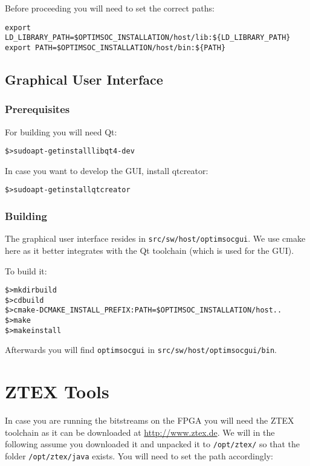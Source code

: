 Before proceeding you will need to set the correct paths:

\begin{verbatim}
export LD_LIBRARY_PATH=$OPTIMSOC_INSTALLATION/host/lib:${LD_LIBRARY_PATH}
export PATH=$OPTIMSOC_INSTALLATION/host/bin:${PATH}
\end{verbatim}

\subsection{Graphical User Interface}

\subsubsection{Prerequisites}

For building you will need Qt:

\begin{alltt}
\$> sudo apt-get install libqt4-dev
\end{alltt}

In case you want to develop the GUI, install qtcreator:

\begin{alltt}
\$> sudo apt-get install qtcreator
\end{alltt}

\subsubsection{Building}

The graphical user interface resides in
\verb|src/sw/host/optimsocgui|. We use cmake here as it better
integrates with the Qt toolchain (which is used for the GUI).

To build it:

\begin{alltt}
\$> mkdir build
\$> cd build
\$> cmake -DCMAKE_INSTALL_PREFIX:PATH=\$OPTIMSOC_INSTALLATION/host ..
\$> make
\$> make install
\end{alltt}

Afterwards you will find \verb|optimsocgui| in
\verb|src/sw/host/optimsocgui/bin|.

\section{ZTEX Tools}

In case you are running the bitstreams on the FPGA you will need the
ZTEX toolchain as it can be downloaded at \url{http://www.ztex.de}. We
will in the following assume you downloaded it and unpacked it to
\verb|/opt/ztex/| so that the folder \verb|/opt/ztex/java| exists. You
will need to set the path accordingly:

